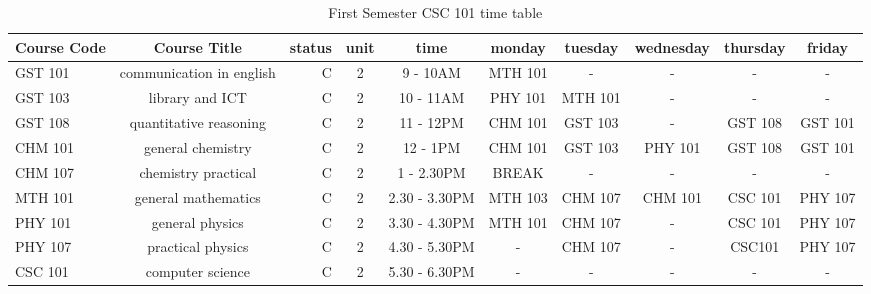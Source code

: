 \documentclass{article}
\begin{document}
	
\begin{sidewaystable}[h!]
	\begin{center}
		\caption{First Semester CSC 101 time table}
		\label{tab:table1}
		\begin{tabular}{l|c|r|c|c|c|c|c|c|c|}
			\textbf{Course Code} & \textbf{Course Title} & \textbf{status} & \textbf{unit} & \textbf{time} & \textbf{monday} & \textbf{tuesday} & \textbf{wednesday} & \textbf{thursday} & \textbf{friday}\\
			\hline
			GST 101 & communication in english & C & 2 & 9 - 10AM & MTH 101 & - & - & - & - \\
			GST 103 & library and ICT & C & 2 & 10  - 11AM & PHY 101 & MTH 101 & - & - & - \\
			GST 108 & quantitative reasoning & C & 2 & 11 - 12PM & CHM 101 & GST 103 & - & GST 108 & GST 101 \\
			CHM 101 & general chemistry & C & 2 & 12 - 1PM & CHM 101 & GST 103 & PHY 101 & GST 108 & GST 101 \\
			CHM 107 & chemistry practical & C & 2 & 1 - 2.30PM & BREAK & - & - & - & - \\
			MTH 101 & general mathematics & C & 2 & 2.30 - 3.30PM & MTH 103 & CHM 107 & CHM 101 & CSC 101 & PHY 107 \\
			PHY 101 & general physics & C & 2 & 3.30 - 4.30PM & MTH 101 & CHM 107 & - & CSC 101 & PHY 107 \\
			PHY 107 & practical physics & C & 2 & 4.30 - 5.30PM & - & CHM 107 & - & CSC101 & PHY 107 \\
			CSC 101  & computer science & C & 2 & 5.30 - 6.30PM & - & - & - & - & - \\
		\end{tabular}
	\end{center}
\end{sidewaystable}
\end{document}

